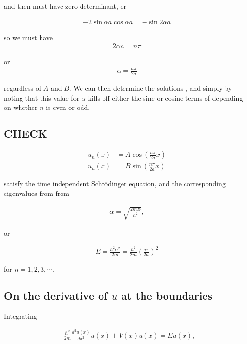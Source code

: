 and then must have zero determinant, or

\begin{align}\label{eqn:PHY356Lecture9:11}
-2 \sin\alpha a \cos\alpha a = -\sin 2 \alpha a
\end{align}

so we must have
\begin{align*}
2 \alpha a = n \pi
\end{align*}

or
\begin{align*}
\alpha = \frac{n \pi}{2a}
\end{align*}

regardless of $A$ and $B$.  We can then determine the solutions , and  simply by noting that this value for $\alpha$ kills off either the sine or cosine terms of  depending on whether $n$ is even or odd.

\subsection{CHECK}

\begin{align*}
u_n(x) &= A \cos \left( \frac{n \pi}{2 a} x \right) \\
u_n(x) &= B \sin \left( \frac{n \pi}{2 a} x \right)
\end{align*}

satisfy the time independent Schr\"{o}dinger equation, and the corresponding eigenvalues from from

\begin{align*}
\alpha = \sqrt{\frac{2 m E}{\hbar^2}},
\end{align*}

or

\begin{align*}
E = \frac{\hbar^2 \alpha^2}{2m} = \frac{\hbar^2}{2m} \left( \frac{n \pi}{2a} \right)^2
\end{align*}

for $n = 1, 2, 3, \cdots$.

\subsection{On the derivative of \texorpdfstring{$u$}{u} at the boundaries}

Integrating

\begin{align}\label{eqn:PHY356Lecture9:20}
-\frac{\hbar^2 }{2m} \frac{d^2 u(x)}{dx^2} u(x) + V(x) u(x) = E u(x),
\end{align}

